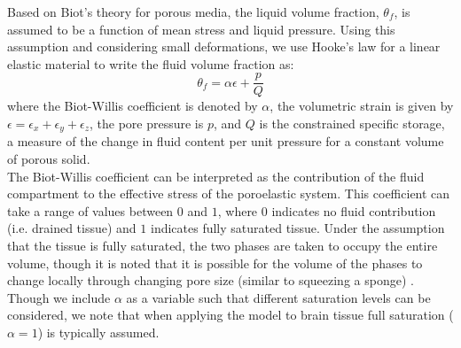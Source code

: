 \documentclass[oneside,11pt,times]{book}
\begin{document}
 

Based on Biot's theory for porous media, the liquid volume fraction, $\theta_f$, is assumed to be a function of mean stress and liquid pressure.
%
Using this assumption and considering small deformations, we use Hooke's law for a linear elastic material to write the fluid volume fraction as:
\begin{equation}
\theta_f = \alpha\epsilon + \frac{p}{Q}
\label{eqn:volumefrac}
\end{equation}
where the Biot-Willis coefficient is denoted by $\alpha$, the volumetric strain is given by $\epsilon = \epsilon_x + \epsilon_y + \epsilon_z$, the pore pressure is $p$, and $Q$ is the constrained specific storage, a measure of the change in fluid content per unit pressure for a constant volume of porous solid. \\

The Biot-Willis coefficient can be interpreted as the contribution of the fluid compartment to the effective stress of the poroelastic system. This coefficient can take a range of values between $0$ and $1$, where $0$ indicates no fluid contribution (i.e. drained tissue) and $1$ indicates fully saturated tissue. Under the assumption that the tissue is fully saturated, the two phases are taken to occupy the entire volume, though it is noted that it is possible for the volume of the phases to change locally through changing pore size (similar to squeezing a sponge) \cite{goriely2016mathematical}. Though we include $\alpha$ as a variable such that different saturation levels can be considered, we note that when applying the model to brain tissue full saturation ($\alpha = 1$) is typically assumed.\\ %
\end{document}
